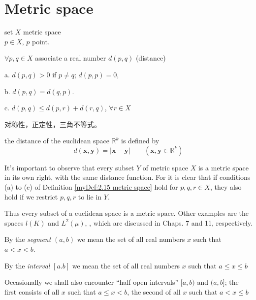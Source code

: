 \section{Metric space}
\begin{myDef}\label{myDef:2.15 metric space}
    set $X$ metric space\\
    $p\in X$, $p$ point.

    $\forall p,q \in X$ associate a real number $d(p,q)$ (distance)

    a. $d(p,q) > 0$ if $p \neq q$; $d(p,p)=0$,

    b. $d(p,q) = d(q,p)$.

    c. $d(p,q) \leq d(p,r) + d(r,q)$, $\forall r\in X$
\end{myDef}
对称性，正定性，三角不等式。

\begin{myExample}
    the distance of the euclidean space $\mathbb{R}^k$ is defined by
    \begin{equation}\label{eq:2.19 distance in eulidean space}
        d(\mathbf{x}, \mathbf{y}) = |\mathbf{x} - \mathbf{y}|
        \qquad (\mathbf{x}, \mathbf{y}\in \mathbb{R}^k)
    \end{equation}
\end{myExample}

It's important to observe that every subset $Y$ of metric space $X$ is a metric space in its own right, with the same distance function. For it is clear that if conditions (a) to (c) of Definition \ref{myDef:2.15 metric space} hold for $p, q, r \in X$, they also hold if we restrict $p, q, r$ to lie in $Y$.

Thus every subset of a euclidean space is a metric space. Other examples
are the spaces $l(K)$ and $L^2 (\mu)$, 
, which are discussed in Chaps. 7 and 11, respectively.

\begin{myDef}\label{myDef:2.17 segment}
By the \emph{segment} $(a, b)$ we mean the set of all real numbers $x$
such that $a < x <b$.

By the \emph{interval} $[a. b]$ we mean the set of all real numbers $x$ such that $a \leq x \leq b$

Occasionally we shall also encounter ``half-open intervals'' $[a, b)$ and $(a, b]$; the first consists of all $x$ such that $a \leq x < b$, the second of all $x$ such that $a < x \leq b$
\end{myDef}

